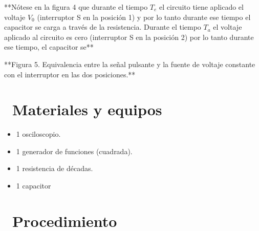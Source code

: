 \documentclass[11pt,a4paper]{article}
\newcommand{\iconotexto}[2]{\textcolor{cyanNeon}{\faIcon{#1}}~#2}
\begin{document}
**Nótese en la figura 4 que durante el tiempo $T_e$ el circuito tiene aplicado el voltaje $V_0$ (interruptor S en la posición 1) y por lo tanto durante ese tiempo el capacitor se carga a través de la resistencia. Durante el tiempo $T_a$ el voltaje aplicado al circuito es cero (interruptor S en la posición 2) por lo tanto durante ese tiempo, el capacitor se**

\begin{center}
\par{}
\end{center}

**Figura 5. Equivalencia entre la señal pulsante y la fuente de voltaje constante con el interruptor en las dos posiciones.**

\section{\iconotexto{box-open}{Materiales y equipos}}

\begin{itemize}[leftmargin=1.4em,itemsep=2pt,topsep=3pt]
  \item 1 osciloscopio.
  \item 1 generador de funciones (cuadrada).
  \item 1 resistencia de décadas.
  \item 1 capacitor
\end{itemize}

\section{\iconotexto{list-ol}{Procedimiento}}
\end{document}
